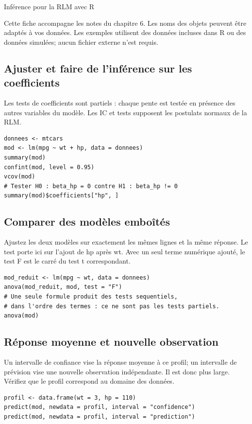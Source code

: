 \documentclass[letterpaper,11pt]{article}
\begin{document}
\begin{center}{\Large Inférence pour la RLM avec R}\end{center}
Cette fiche accompagne les notes du chapitre 6. Les noms des objets peuvent être adaptés à vos données. Les exemples utilisent des données incluses dans R ou des données simulées; aucun fichier externe n’est requis.

\par\medskip\noindent\begin{minipage}{\linewidth}
\subsection*{Ajuster et faire de l’inférence sur les coefficients}
Les tests de coefficients sont partiels : chaque pente est testée en présence des autres variables du modèle. Les IC et tests supposent les postulats normaux de la RLM.
\begin{Verbatim}
donnees <- mtcars
mod <- lm(mpg ~ wt + hp, data = donnees)
summary(mod)
confint(mod, level = 0.95)
vcov(mod)
# Tester H0 : beta_hp = 0 contre H1 : beta_hp != 0
summary(mod)$coefficients["hp", ]
\end{Verbatim}

\end{minipage}\par
\par\medskip\noindent\begin{minipage}{\linewidth}
\subsection*{Comparer des modèles emboîtés}
Ajustez les deux modèles sur exactement les mêmes lignes et la même réponse. Le test porte ici sur l'ajout de hp après wt. Avec un seul terme numérique ajouté, le test F est le carré du test t correspondant.
\begin{Verbatim}
mod_reduit <- lm(mpg ~ wt, data = donnees)
anova(mod_reduit, mod, test = "F")
# Une seule formule produit des tests sequentiels,
# dans l'ordre des termes : ce ne sont pas les tests partiels.
anova(mod)
\end{Verbatim}

\end{minipage}\par
\par\medskip\noindent\begin{minipage}{\linewidth}
\subsection*{Réponse moyenne et nouvelle observation}
Un intervalle de confiance vise la réponse moyenne à ce profil; un intervalle de prévision vise une nouvelle observation indépendante. Il est donc plus large. Vérifiez que le profil correspond au domaine des données.
\begin{Verbatim}
profil <- data.frame(wt = 3, hp = 110)
predict(mod, newdata = profil, interval = "confidence")
predict(mod, newdata = profil, interval = "prediction")
\end{Verbatim}

\end{minipage}\par
\end{document}
